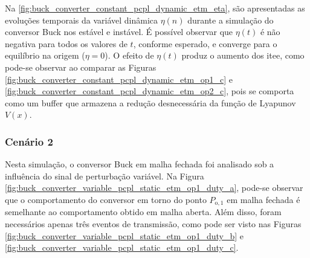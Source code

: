 Na \autoref{fig:buck_converter_constant_pcpl_dynamic_etm_eta}, são apresentadas as evoluções temporais da variável dinâmica $\eta(n)$ durante a simulação do conversor Buck nos  estável e instável. É possível observar que $\eta(t)$ é não negativa para todos os valores de $t$, conforme esperado, e converge para o equilíbrio na origem ($\eta = 0$). O efeito de $\eta(t)$ produz o aumento dos \acrshort{itee}, como pode-se observar ao comparar as Figuras \ref{fig:buck_converter_constant_pcpl_dynamic_etm_op1_c} e \ref{fig:buck_converter_constant_pcpl_dynamic_etm_op2_c}, pois se comporta como um buffer que armazena a redução desnecessária da função de Lyapunov $V(x)$.

\subsubsection{Cenário 2}

Nesta simulação, o conversor Buck em malha fechada foi analisado sob a influência do sinal de perturbação variável. Na Figura \ref{fig:buck_converter_variable_pcpl_static_etm_op1_duty_a}, pode-se observar que o comportamento do conversor em torno do ponto $P_{\mathrm{o}, 1}$ em malha fechada é semelhante ao comportamento obtido em malha aberta. Além disso, foram necessários apenas três eventos de transmissão, como pode ser visto nas Figuras \ref{fig:buck_converter_variable_pcpl_static_etm_op1_duty_b} e \ref{fig:buck_converter_variable_pcpl_static_etm_op1_duty_c}.

